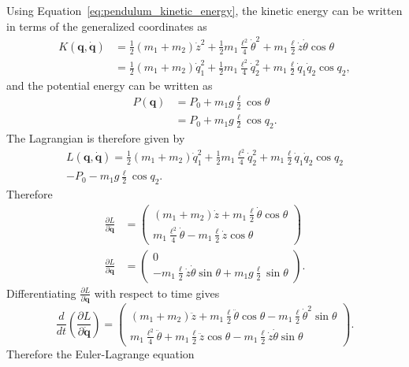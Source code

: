 Using Equation~\eqref{eq:pendulum_kinetic_energy}, the kinetic energy can be written in terms of the generalized coordinates as
\begin{align*}
K(\mathbf{q},\dot{\mathbf{q}}) &= \frac{1}{2}(m_1+m_2)\dot{z}^2 + \frac{1}{2}m_1\frac{\ell^2}{4}\dot{\theta}^2 + m_1\frac{\ell}{2}\dot{z}\dot{\theta}\cos\theta \\
&= \frac{1}{2}(m_1+m_2)\dot{q}_1^2 + \frac{1}{2}m_1\frac{\ell^2}{4}\dot{q}_2^2 + m_1\frac{\ell}{2}\dot{q}_1\dot{q}_2\cos q_2,
\end{align*}
and the potential energy can be written as
\begin{align*}
P(\mathbf{q}) &= P_0 + m_1 g \frac{\ell}{2}\cos\theta\\
&= P_0 + m_1 g \frac{\ell}{2}\cos q_2.
\end{align*}
The Lagrangian is therefore given by
\begin{multline*}
L(\mathbf{q},\dot{\mathbf{q}}) = \frac{1}{2}(m_1+m_2)\dot{q}_1^2 + \frac{1}{2}m_1\frac{\ell^2}{4}\dot{q}_2^2 + m_1\frac{\ell}{2}\dot{q}_1\dot{q}_2\cos q_2 \\ - P_0 - m_1 g \frac{\ell}{2}\cos q_2.	
\end{multline*}
Therefore
\begin{align*}
\frac{\partial L}{\partial\dot{\mathbf{q}}} &= \begin{pmatrix} 
(m_1+m_2)\dot{z} + m_1\frac{\ell}{2}\dot{\theta}\cos\theta \\
m_1\frac{\ell^2}{4}\dot{\theta} - m_1\frac{\ell}{2}\dot{z}\cos\theta
\end{pmatrix} \\
\frac{\partial L}{\partial\mathbf{q}} &= \begin{pmatrix}
0 \\ -m_1\frac{\ell}{2}\dot{z}\dot{\theta}\sin\theta + m_1 g \frac{\ell}{2} \sin\theta
\end{pmatrix}.
\end{align*}
Differentiating $\frac{\partial L}{\partial \dot{\mathbf{q}}}$ with respect to time gives
\[
\frac{d}{dt}\left(\frac{\partial L}{\partial \dot{\mathbf{q}}}\right) = \begin{pmatrix} 
(m_1+m_2)\ddot{z} + m_1 \frac{\ell}{2} \ddot{\theta}\cos\theta - m_1 \frac{\ell}{2} \dot{\theta}^2\sin\theta \\
m_1 \frac{\ell^2}{4} \ddot{\theta} + m_1 \frac{\ell}{2} \ddot{z}\cos\theta - m_1 \frac{\ell}{2} \dot{z}\dot{\theta}\sin\theta
\end{pmatrix}.
\]
Therefore the Euler-Lagrange equation
